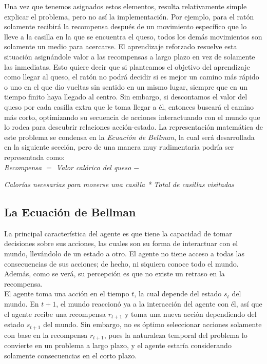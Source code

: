 Una vez que tenemos asignados estos elementos, resulta relativamente simple explicar el problema, pero no as\'i la implementaci\'on. Por ejemplo, para el rat\'on solamente recibir\'a la recompensa despu\'es de un movimiento espec\'ifico que lo lleve a la casilla en la que se encuentra el queso, todos los dem\'as movimientos son solamente un medio para acercarse. El aprendizaje reforzado resuelve esta situaci\'on asign\'andole valor a las recompensas a largo plazo en vez de solamente las inmediatas. Esto quiere decir que si planteamos el objetivo del aprendizaje como llegar al queso, el rat\'on no podr\'a decidir si es mejor un camino m\'as r\'apido o uno en el que dio vueltas sin sentido en un mismo lugar, siempre que en un tiempo finito haya llegado al centro. Sin embargo, si descontamos el valor del queso por cada casilla extra que le toma llegar a \'el, entonces buscar\'a el camino m\'as corto, optimizando su secuencia de acciones interactuando con el mundo que lo rodea para descubrir relaciones acci\'on-estado. La representaci\'on matem\'atica de este problema se condensa en la \textit{Ecuaci\'on de Bellman}, la cual ser\'a desarrollada en la siguiente secci\'on, pero de una manera muy rudimentaria podr\'ia ser representada como:\\

\textit{Recompensa $=$ Valor cal\'orico del queso $-$}

\hspace{22mm} \textit{Calor\'ias necesarias para moverse una casilla * Total de casillas visitadas}
  
\subsection{La Ecuaci\'on de Bellman}  
    
La principal caracter\'istica del agente es que tiene la capacidad de tomar decisiones sobre sus acciones, las cuales son su forma de interactuar con el mundo, llev\'andolo de un estado a otro. El agente no tiene acceso a todas las consecuencias de sus acciones; de hecho, ni siquiera conoce todo el mundo. Adem\'as, como se ver\'a, su percepci\'on es que no existe un retraso en la recompensa.\\

El agente toma una acci\'on en el tiempo $t$, la cual depende del estado $s_t$ del mundo. En $t+1$, el mundo reaccion\'o ya a la interacci\'on del agente con \'el, as\'i que el agente recibe una recompensa $r_{t+1}$ y toma una nueva acci\'on dependiendo del estado $s_{t+1}$ del mundo. Sin embargo, no es \'optimo seleccionar acciones solamente con base en la recompensa $r_{t+1}$, pues la naturaleza temporal del problema lo convierte en un problema a largo plazo, y el agente estar\'ia considerando solamente consecuencias en el corto plazo.\\

